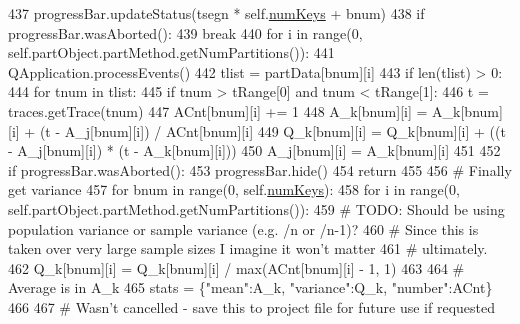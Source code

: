 \begin{DoxyCode}
{437                 progressBar.updateStatus(tsegn * self.\hyperlink{classsoftware_1_1chipwhisperer_1_1analyzer_1_1utils_1_1TraceExplorerScripts_1_1PartitionDisplay_1_1PartitionDisplay_a9609f827035095f248787dbde121fa08}{numKeys} + bnum)
438                 \textcolor{keywordflow}{if} progressBar.wasAborted():
439                     \textcolor{keywordflow}{break}
440                 \textcolor{keywordflow}{for} i \textcolor{keywordflow}{in} range(0, self.partObject.partMethod.getNumPartitions()):
441                     QApplication.processEvents()
442                     tlist = partData[bnum][i]
443                     \textcolor{keywordflow}{if} len(tlist) > 0:
444                         \textcolor{keywordflow}{for} tnum \textcolor{keywordflow}{in} tlist:
445                             \textcolor{keywordflow}{if} tnum > tRange[0] \textcolor{keywordflow}{and} tnum < tRange[1]:
446                                 t = traces.getTrace(tnum)
447                                 ACnt[bnum][i] += 1
448                                 A\_k[bnum][i] = A\_k[bnum][i] + (t - A\_j[bnum][i]) / ACnt[bnum][i]
449                                 Q\_k[bnum][i] = Q\_k[bnum][i] + ((t - A\_j[bnum][i]) * (t - A\_k[bnum][i]))
450                                 A\_j[bnum][i] = A\_k[bnum][i]
451 
452             \textcolor{keywordflow}{if} progressBar.wasAborted():
453                 progressBar.hide()
454                 \textcolor{keywordflow}{return}
455 
456             \textcolor{comment}{# Finally get variance}
457             \textcolor{keywordflow}{for} bnum \textcolor{keywordflow}{in} range(0, self.\hyperlink{classsoftware_1_1chipwhisperer_1_1analyzer_1_1utils_1_1TraceExplorerScripts_1_1PartitionDisplay_1_1PartitionDisplay_a9609f827035095f248787dbde121fa08}{numKeys}):
458                     \textcolor{keywordflow}{for} i \textcolor{keywordflow}{in} range(0, self.partObject.partMethod.getNumPartitions()):
459                         \textcolor{comment}{# TODO: Should be using population variance or sample variance (e.g. /n or /n-1)?}
460                         \textcolor{comment}{#      Since this is taken over very large sample sizes I imagine it won't matter}
461                         \textcolor{comment}{#      ultimately.}
462                         Q\_k[bnum][i] = Q\_k[bnum][i] / max(ACnt[bnum][i] - 1, 1)
463 
464             \textcolor{comment}{# Average is in A\_k}
465             stats = \{\textcolor{stringliteral}{"mean"}:A\_k, \textcolor{stringliteral}{"variance"}:Q\_k, \textcolor{stringliteral}{"number"}:ACnt\}
466 
467             \textcolor{comment}{# Wasn't cancelled - save this to project file for future use if requested}
}
\end{DoxyCode}
